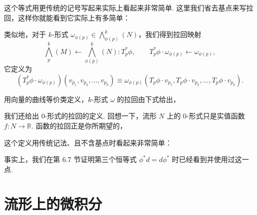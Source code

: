 这个等式用更传统的记号写起来实际上看起来非常简单. 这里我们省去基点来写拉回，这样你就能看到它实际上有多简单：
\begin{center}
\end{center}

类似地，对于 $k$-形式 $\omega_{\phi(p)}\in\bigwedge_{\phi(p)}^k(N)$，我们得到拉回映射
\[
\bigwedge_p^k(M)\longleftarrow\bigwedge_{\phi(p)}^k(N):T_p^*\phi,\qquad T_p^*\phi\cdot\omega_{\phi(p)}\longleftarrow\omega_{\phi(p)},
\]
它定义为
\[
\left(T_p^*\phi\cdot\omega_{\phi(p)}\right)(v_{p_1},v_{p_2},\ldots,v_{p_k})\equiv\omega_{\phi(p)}\left(T_p\phi\cdot v_{p_1},T_p\phi\cdot v_{p_2},\ldots,T_p\phi\cdot v_{p_k}\right).
\]

用向量的曲线等价类定义，$k$-形式 $\omega$ 的拉回由下式给出，
\begin{center}
\end{center}

我们还给出 0-形式的拉回的定义. 回想一下，流形 $N$ 上的 0-形式只是实值函数 $f:N\to\mathbb{R}$. 函数的拉回正是你所期望的，
\begin{center}
\end{center}

这个定义用传统记法、且不含基点时看起来非常简单：
\begin{center}
\end{center}

事实上，我们在第 6.7 节证明第三个恒等式 $\phi^*d=d\phi^*$ 时已经看到并使用过这一点.

\section{流形上的微积分}

